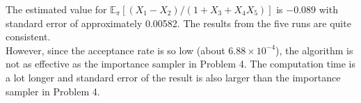 The estimated value for $\mathbb{E}_\pi[(X_1-X_2)/(1+X_3+X_4X_5)]$ is \ensuremath{-0.089} with standard error of approximately 0.00582. The results from the five runs are quite consistent.\\
However, since the acceptance rate is so low (about \ensuremath{6.88\times 10^{-4}}), the algorithm is not as effective as the importance sampler in Problem 4. The computation time is a lot longer and standard error of the result is also larger than the importance sampler in Problem 4. 
